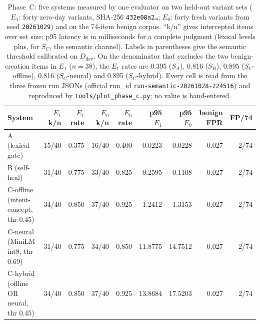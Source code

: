 \begin{table}[t]
\centering
\caption{Phase~C: five systems measured by one evaluator on two held-out variant
sets ($E_1$: forty zero-day variants, SHA-256 \texttt{432e08a2\ldots}; $E_0$:
forty fresh variants from seed \texttt{20261029}) and on the 74-item benign
corpus. ``k/n'' gives intercepted items over set size; p95 latency is in
milliseconds for a complete judgment (lexical levels plus, for $S_C$, the
semantic channel). Labels in parentheses give the semantic threshold calibrated
on $D_{\mathrm{dev}}$. On the denominator that excludes the two benign-creation
items in $E_1$ ($n=38$), the $E_1$ rates are 0.395 ($S_A$), 0.816 ($S_B$), 0.895
($S_C$-offline), 0.816 ($S_C$-neural) and 0.895 ($S_C$-hybrid). Every cell is
read from the three frozen run JSONs (official run\_id
\texttt{run-semantic-20261028-224516}) and reproduced by
\texttt{tools/plot\_phase\_c.py}; no value is hand-entered.}
\label{tab:phase-c}
\begin{tabular}{@{}lrrrrrrrr@{}}
\toprule
System & $E_1$ k/n & $E_1$ rate & $E_0$ k/n & $E_0$ rate
       & p95 $E_1$ & p95 $E_0$ & benign FPR & FP/74 \\
\midrule
A (lexical gate) & 15/40 & 0.375 & 16/40 & 0.400 & 0.0223 & 0.0228 & 0.027 & 2/74 \\
B (self-heal) & 31/40 & 0.775 & 33/40 & 0.825 & 0.2595 & 0.1108 & 0.027 & 2/74 \\
C-offline (intent-concept, thr 0.45) & 34/40 & 0.850 & 37/40 & 0.925 & 1.2412 & 1.3153 & 0.027 & 2/74 \\
C-neural (MiniLM int8, thr 0.69) & 31/40 & 0.775 & 34/40 & 0.850 & 11.8775 & 14.7512 & 0.027 & 2/74 \\
C-hybrid (offline OR neural, thr 0.45) & 34/40 & 0.850 & 37/40 & 0.925 & 13.8684 & 17.5203 & 0.027 & 2/74 \\
\bottomrule
\end{tabular}
\end{table}

